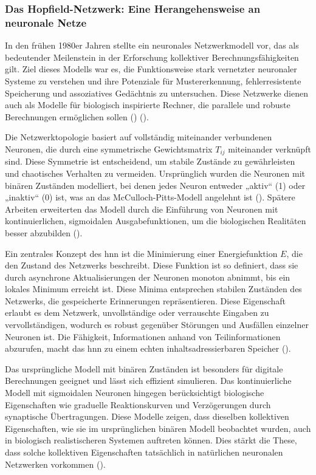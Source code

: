 \subsubsection{Das Hopfield-Netzwerk: Eine Herangehensweise an neuronale Netze}
\label{chap:Das Hopfield-Netzwerk: Eine Herangehensweise an neuronale Netze}

In den frühen 1980er Jahren stellte \citeauthor{Hopfield1982} ein neuronales Netzwerkmodell vor, das als bedeutender Meilenstein in der Erforschung kollektiver Berechnungsfähigkeiten gilt. Ziel dieses Modells war es, die Funktionsweise stark vernetzter neuronaler Systeme zu verstehen und ihre Potenziale für Mustererkennung, fehlerresistente Speicherung und assoziatives Gedächtnis zu untersuchen. Diese Netzwerke dienen auch als Modelle für biologisch inspirierte Rechner, die parallele und robuste Berechnungen ermöglichen sollen (\cite[vgl. S. 2554]{Hopfield1982}) (\cite[vgl. S. 3088]{Hopfield1984}).

Die Netzwerktopologie basiert auf vollständig miteinander verbundenen Neuronen, die durch eine symmetrische Gewichtsmatrix \(T_{ij}\) miteinander verknüpft sind. Diese Symmetrie ist entscheidend, um stabile Zustände zu gewährleisten und chaotisches Verhalten zu vermeiden. Ursprünglich wurden die Neuronen mit binären Zuständen modelliert, bei denen jedes Neuron entweder „aktiv“ (1) oder „inaktiv“ (0) ist, was an das McCulloch-Pitts-Modell angelehnt ist (\cite[vgl. S. 2555]{Hopfield1982}). Spätere Arbeiten erweiterten das Modell durch die Einführung von Neuronen mit kontinuierlichen, sigmoidalen Ausgabefunktionen, um die biologischen Realitäten besser abzubilden (\cite[vgl. S. 3088]{Hopfield1984}).

Ein zentrales Konzept des \ac{hnn} ist die Minimierung einer Energiefunktion \(E\), die den Zustand des Netzwerks beschreibt. Diese Funktion ist so definiert, dass sie durch asynchrone Aktualisierungen der Neuronen monoton abnimmt, bis ein lokales Minimum erreicht ist. Diese Minima entsprechen stabilen Zuständen des Netzwerks, die gespeicherte Erinnerungen repräsentieren. Diese Eigenschaft erlaubt es dem Netzwerk, unvollständige oder verrauschte Eingaben zu vervollständigen, wodurch es robust gegenüber Störungen und Ausfällen einzelner Neuronen ist. Die Fähigkeit, Informationen anhand von Teilinformationen abzurufen, macht das \ac{hnn} zu einem echten inhaltsadressierbaren Speicher (\cite[vgl. S. 2554 f.]{Hopfield1982}).

Das ursprüngliche Modell mit binären Zuständen ist besonders für digitale Berechnungen geeignet und lässt sich effizient simulieren. Das kontinuierliche Modell mit sigmoidalen Neuronen hingegen berücksichtigt biologische Eigenschaften wie graduelle Reaktionskurven und Verzögerungen durch synaptische Übertragungen. Diese Modelle zeigen, dass dieselben kollektiven Eigenschaften, wie sie im ursprünglichen binären Modell beobachtet wurden, auch in biologisch realistischeren Systemen auftreten können. Dies stärkt die These, dass solche kollektiven Eigenschaften tatsächlich in natürlichen neuronalen Netzwerken vorkommen (\cite[vgl. S. 3089]{Hopfield1984}).

